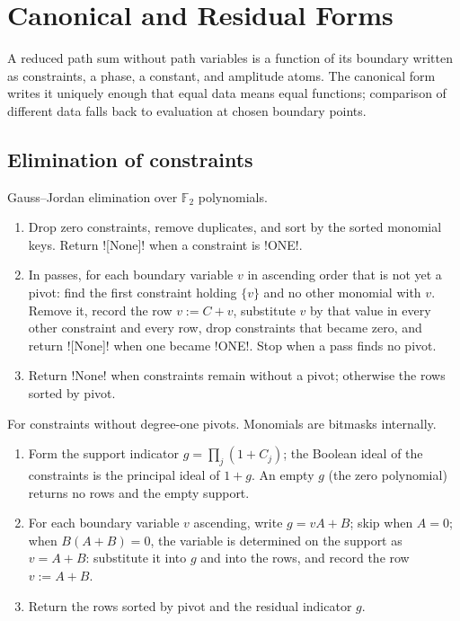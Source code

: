 \section{Canonical and Residual Forms}\label{sec:algebra-canon}

A reduced path sum without path variables is a function of its boundary written as constraints, a phase, a constant, and amplitude atoms. The canonical form writes it uniquely enough that equal data means equal functions; comparison of different data falls back to evaluation at chosen boundary points.

\subsection{Elimination of constraints}

\begin{algorithm}\label{alg:algebra-eliminate}
Gauss--Jordan elimination over $\mathbb{F}_2$ polynomials.
\begin{enumerate}
\item Drop zero constraints, remove duplicates, and sort by the sorted monomial keys. Return \py![None]! when a constraint is \py!ONE!.
\item In passes, for each boundary variable $v$ in ascending order that is not yet a pivot: find the first constraint holding $\{v\}$ and no other monomial with $v$. Remove it, record the row $v:=C+v$, substitute $v$ by that value in every other constraint and every row, drop constraints that became zero, and return \py![None]! when one became \py!ONE!. Stop when a pass finds no pivot.
\item Return \py!None! when constraints remain without a pivot; otherwise the rows sorted by pivot.
\end{enumerate}
\end{algorithm}

\begin{algorithm}\label{alg:algebra-boolean-eliminate}
For constraints without degree-one pivots. Monomials are bitmasks internally.
\begin{enumerate}
\item Form the support indicator $g=\prod_j(1+C_j)$; the Boolean ideal of the constraints is the principal ideal of $1+g$. An empty $g$ (the zero polynomial) returns no rows and the empty support.
\item For each boundary variable $v$ ascending, write $g=vA+B$; skip when $A=0$; when $B(A+B)=0$, the variable is determined on the support as $v=A+B$: substitute it into $g$ and into the rows, and record the row $v:=A+B$.
\item Return the rows sorted by pivot and the residual indicator $g$.
\end{enumerate}
\end{algorithm}

